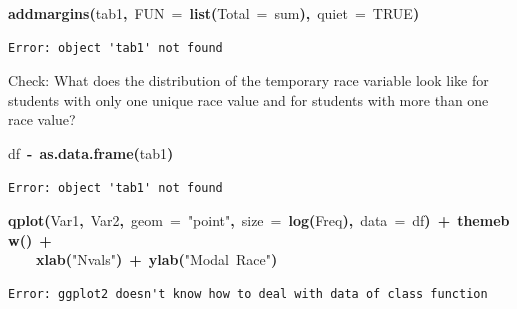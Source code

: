 \documentclass[12pt]{article}
\makeatletter
\newcommand{\hlnumber}[1]{\textcolor[rgb]{0,0,0}{#1}}%
\newcommand{\hlfunctioncall}[1]{\textcolor[rgb]{0.501960784313725,0,0.329411764705882}{\textbf{#1}}}%
\newcommand{\hlstring}[1]{\textcolor[rgb]{0.6,0.6,1}{#1}}%
\newcommand{\hlkeyword}[1]{\textcolor[rgb]{0,0,0}{\textbf{#1}}}%
\newcommand{\hlargument}[1]{\textcolor[rgb]{0.690196078431373,0.250980392156863,0.0196078431372549}{#1}}%
\newcommand{\hlassignement}[1]{\textcolor[rgb]{0,0,0}{\textbf{#1}}}%
\newcommand{\hlsymbol}[1]{\textcolor[rgb]{0,0,0}{#1}}%
\newcommand{\hlstd}[1]{\textcolor[rgb]{0,0,0}{#1}}%
\newenvironment{kframe}{%
 \def\FrameCommand##1{\hskip\@totalleftmargin \hskip-\fboxsep
 \colorbox{shadecolor}{##1}\hskip-\fboxsep
     \hskip-\linewidth \hskip-\@totalleftmargin \hskip\columnwidth}%
 \MakeFramed {\advance\hsize-\width
   \@totalleftmargin\z@ \linewidth\hsize
   \@setminipage}}%
 {\par\unskip\endMakeFramed}
\newenvironment{knitrout}{}{} %
\renewenvironment{knitrout}{\begin{footnotesize}}{\end{footnotesize}}
\makeatother
\begin{document}
\begin{knitrout}
\begin{kframe}
\begin{verbatim}
\end{verbatim}
\begin{flushleft}
\ttfamily\noindent
\hlfunctioncall{addmargins}\hlkeyword{(}\hlsymbol{tab1}\hlkeyword{,}{\ }\hlargument{FUN}{\ }\hlargument{=}{\ }\hlfunctioncall{list}\hlkeyword{(}\hlargument{Total}{\ }\hlargument{=}{\ }\hlsymbol{sum}\hlkeyword{)}\hlkeyword{,}{\ }\hlargument{quiet}{\ }\hlargument{=}{\ }\hlnumber{TRUE}\hlkeyword{)}\mbox{}
\normalfont
\end{flushleft}
\begin{verbatim}
Error: object 'tab1' not found
\end{verbatim}
\end{kframe}
\end{knitrout}


Check:  What does the distribution of the temporary race variable look like for students with only one unique race value and for 
students with more than one race value?

\begin{knitrout}
\color{fgcolor}\begin{kframe}
\begin{flushleft}
\ttfamily\noindent
\hlsymbol{df}{\ }\hlassignement{\usebox{\hlnormalsizeboxlessthan}-}{\ }\hlfunctioncall{as.data.frame}\hlkeyword{(}\hlsymbol{tab1}\hlkeyword{)}\mbox{}
\normalfont
\end{flushleft}
\begin{verbatim}
Error: object 'tab1' not found
\end{verbatim}
\begin{flushleft}
\ttfamily\noindent
\hlfunctioncall{qplot}\hlkeyword{(}\hlsymbol{Var1}\hlkeyword{,}{\ }\hlsymbol{Var2}\hlkeyword{,}{\ }\hlargument{geom}{\ }\hlargument{=}{\ }\hlstring{"{}point"{}}\hlkeyword{,}{\ }\hlargument{size}{\ }\hlargument{=}{\ }\hlfunctioncall{log}\hlkeyword{(}\hlsymbol{Freq}\hlkeyword{)}\hlkeyword{,}{\ }\hlargument{data}{\ }\hlargument{=}{\ }\hlsymbol{df}\hlkeyword{)}{\ }\hlkeyword{+}{\ }\hlfunctioncall{theme\usebox{\hlnormalsizeboxunderscore}bw}\hlkeyword{(}\hlkeyword{)}{\ }\hlkeyword{+}\hspace*{\fill}\\
\hlstd{}{\ }{\ }{\ }{\ }\hlfunctioncall{xlab}\hlkeyword{(}\hlstring{"{}Nvals"{}}\hlkeyword{)}{\ }\hlkeyword{+}{\ }\hlfunctioncall{ylab}\hlkeyword{(}\hlstring{"{}Modal{\ }Race"{}}\hlkeyword{)}\mbox{}
\normalfont
\end{flushleft}
\begin{verbatim}
Error: ggplot2 doesn't know how to deal with data of class function
\end{verbatim}
\end{kframe}
\end{knitrout}
\end{document}
